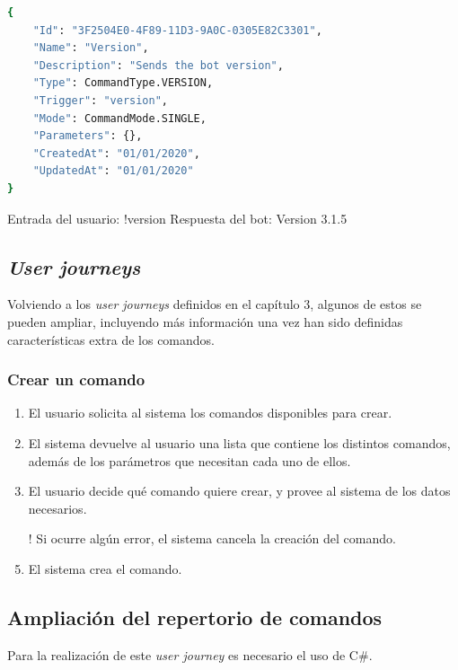 \begin{lstlisting}[language=sh]
{
    "Id": "3F2504E0-4F89-11D3-9A0C-0305E82C3301",
    "Name": "Version",
    "Description": "Sends the bot version",
    "Type": CommandType.VERSION,
    "Trigger": "version",
    "Mode": CommandMode.SINGLE,
    "Parameters": {},
    "CreatedAt": "01/01/2020",
    "UpdatedAt": "01/01/2020"
}
\end{lstlisting}

Entrada del usuario: !version
Respuesta del bot: Version 3.1.5





\subsection{\textit{User journeys}}

Volviendo a los \textit{user journeys} definidos en el capítulo 3, algunos de estos se pueden ampliar, incluyendo más información una vez han sido definidas características extra de los comandos.

\subsubsection{Crear un comando}

\begin{enumerate}
	\item El usuario solicita al sistema los comandos disponibles para crear.
	\item El sistema devuelve al usuario una lista que contiene los distintos comandos, además de los parámetros que necesitan cada uno de ellos.
	\item El usuario decide qué comando quiere crear, y provee al sistema de los datos necesarios.
	\item[!] Si ocurre algún error, el sistema cancela la creación del comando.
	\item El sistema crea el comando.
\end{enumerate}

\subsection{Ampliación del repertorio de comandos}

Para la realización de este \textit{user journey} es necesario el uso de C\#.

